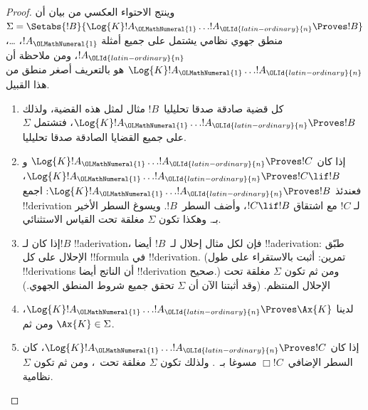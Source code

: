\documentclass[../../../include/open-logic-section]{subfiles}
\begin{document}
\begin{proof}
  وينتج الاحتواء العكسي من بيان أن
  $\Sigma = \Setabs{!B}{\Log{K} !A_\OLMathNumeral{1} \dots !A_\OLId{latin-ordinary}{n} \Proves !B }$ منطق جهوي
  نظامي يشتمل على جميع أمثلة $!A_\OLMathNumeral{1}$، \dots، $!A_\OLId{latin-ordinary}{n}$، ومن ملاحظة أن
  $\Log{K} !A_\OLMathNumeral{1} \dots !A_\OLId{latin-ordinary}{n}$ هو بالتعريف أصغر منطق من هذا القبيل.
  \begin{enumerate}
    \item كل قضية صادقة صدقا تحليليا~$!B$ مثال لمثل هذه القضية، ولذلك
      $\Log{K}!A_\OLMathNumeral{1}\dots!A_\OLId{latin-ordinary}{n} \Proves !B$، فتشتمل $\Sigma$ على جميع
      القضايا الصادقة صدقا تحليليا.
    \item إذا كان $\Log{K}!A_\OLMathNumeral{1}\dots!A_\OLId{latin-ordinary}{n} \Proves !C$ و
      $\Log{K}!A_\OLMathNumeral{1}\dots!A_\OLId{latin-ordinary}{n} \Proves !C \lif !B$، فعندئذ
      $\Log{K}!A_\OLMathNumeral{1}\dots!A_\OLId{latin-ordinary}{n} \Proves !B$: اجمع !!{derivation} لـ
      $!C$ مع اشتقاق $!C \lif !B$، وأضف السطر~$!B$. ويسوغ السطر
      الأخير بـ\MP{}. وهكذا تكون $\Sigma$ مغلقة تحت القياس الاستثنائي.
    \item إذا كان لـ$!B$ !!a{derivation}، فإن لكل مثال إحلال لـ~$!B$
      أيضا !!a{derivation}: طبّق الإحلال على كل !!{formula} في
      !!{derivation}. (تمرين: أثبت بالاستقراء على طول !!{derivation}s
      أن الناتج أيضا !!{derivation} صحيح.) ومن ثم تكون $\Sigma$
      مغلقة تحت الإحلال المنتظم. (وقد أثبتنا الآن أن $\Sigma$ تحقق
      جميع شروط المنطق الجهوي.)
    \item لدينا $\Log{K}!A_\OLMathNumeral{1}\dots!A_\OLId{latin-ordinary}{n} \Proves \Ax{K}$، ومن ثم
      $\Ax{K} \in \Sigma$.
    \item إذا كان $\Log{K}!A_\OLMathNumeral{1}\dots!A_\OLId{latin-ordinary}{n} \Proves !C$، كان السطر
      الإضافي~$\Box !C$ مسوغا بـ~\Nec. ولذلك تكون $\Sigma$ مغلقة
      تحت~\Nec، ومن ثم تكون $\Sigma$ نظامية.
  \end{enumerate}
\end{proof}
\end{document}
